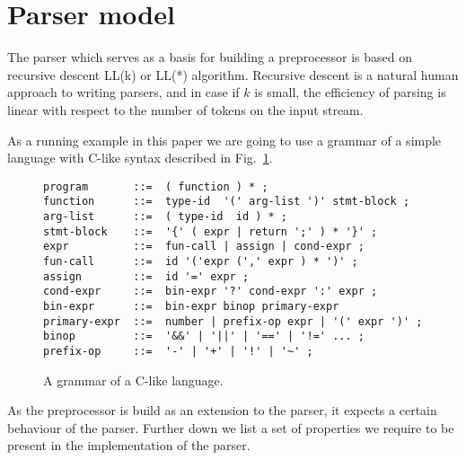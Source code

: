\section{\label{sec:parser}Parser model}

The parser which serves as a basis for building a preprocessor is 
based on recursive descent LL(k) or LL(*) algorithm.  Recursive
descent is a natural human approach to writing parsers, and in
case if $k$ is small, the efficiency of parsing is linear with
respect to the number of tokens on the input stream. 

As a running example in this paper we are going to use a
grammar of a simple language with C-like syntax described in
Fig.~\ref{fig:grammar}.

\begin{figure}[h!]
\centering
\begin{verbatim}
program       ::=  ( function ) * ;
function      ::=  type-id  '(' arg-list ')' stmt-block ;
arg-list      ::=  ( type-id  id ) * ;
stmt-block    ::=  '{' ( expr | return ';' ) * '}' ;
expr          ::=  fun-call | assign | cond-expr ;
fun-call      ::=  id '('expr (',' expr ) * ')' ;
assign        ::=  id '=' expr ;
cond-expr     ::=  bin-expr '?' cond-expr ':' expr ;
bin-expr      ::=  bin-expr binop primary-expr
primary-expr  ::=  number | prefix-op expr | '(' expr ')' ;
binop         ::=  '&&' | '||' | '==' | '!=' ... ;
prefix-op     ::=  '-' | '+' | '!' | '~' ;
\end{verbatim}
\caption{\label{fig:grammar}A grammar of a C-like language.}
\end{figure}

\noindent
As the preprocessor is build as an extension to the parser, 
it expects a certain behaviour of the parser.  Further down
we list a set of properties we require to be present in the 
implementation of the parser.

